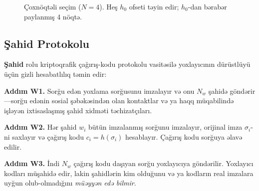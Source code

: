 \documentclass[11pt,a4paper,twocolumn]{article}
\begin{document}
\begin{figure}[ht]
\centering
{}
\caption{Çoxnöqtəli seçim ($N{=}4$). Heş $h_0$ ofseti təyin edir; $h_0$-dan bərabər paylanmış 4 nöqtə.}
\label{fig:multipoint}
\end{figure}

\subsection{Şahid Protokolu}

\textbf{Şahid} rolu kriptoqrafik çağırış-kodu protokolu vasitəsilə yoxlayıcının dürüstlüyü üçün gizli hesabatlılıq təmin edir:

\textbf{Addım W1.} Sorğu edən yoxlama sorğusunu imzalayır və onu $N_w$ şahidə göndərir---sorğu edənin sosial şəbəkəsindən olan kontaktlar və ya haqq müqabilində işləyən ixtisaslaşmış şahid xidməti təchizatçıları.

\textbf{Addım W2.} Hər şahid $w_i$ bütün imzalanmış sorğunu imzalayır, orijinal imza $\sigma_i$-ni saxlayır və çağırış kodu $c_i = h(\sigma_i)$ hesablayır. Çağırış kodu sorğuya əlavə edilir.

\textbf{Addım W3.} İndi $N_w$ çağırış kodu daşıyan sorğu yoxlayıcıya göndərilir. Yoxlayıcı kodları müşahidə edir, lakin şahidlərin kim olduğunu və ya kodların real imzalara uyğun olub-olmadığını \emph{müəyyən edə bilmir}.
\end{document}
